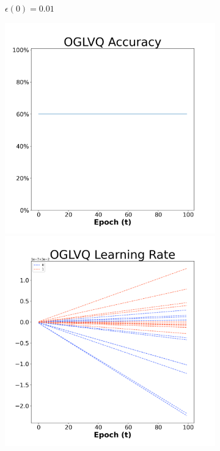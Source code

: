 \begin{figure}[H]
\begin{subfigure}{0.3\textwidth}
  \caption{$\epsilon(0)=0.01$}
\end{subfigure}\hfil %
\begin{subfigure}{0.3\textwidth}
  \includegraphics[width=\linewidth]{images/exper1/NSP/OGLVQ_0.03_acc.png}
  \includegraphics[width=\linewidth]{images/exper1/NSP/OGLVQ_0.03_lr.png}

\end{subfigure}
\end{figure}
